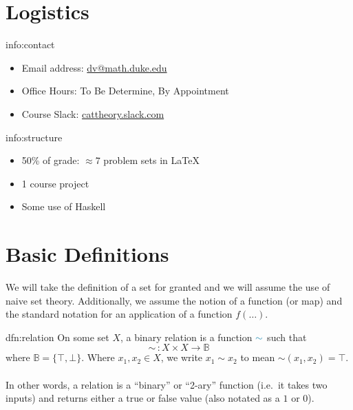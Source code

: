 



\section{Logistics}\label{sec:logistics}

\begin{info}{info:contact}
    \begin{itemize}
        \item Email address: \href{mailto:dv@math.duke.edu}{dv@math.duke.edu}
        \item Office Hours: To Be Determine, By Appointment
        \item Course Slack: \href{cattheory.slack.com}{cattheory.slack.com}
    \end{itemize}
\end{info}

\begin{info}{info:structure}
    \begin{itemize}
        \item 50\% of grade: \( \approx 7 \) problem sets in \LaTeX
        \item 1 course project
        \item Some use of Haskell
    \end{itemize}
\end{info}

\section{Basic Definitions}\label{sec:definitions}

We will take the definition of a set for granted and we will assume the use of naive set theory.
Additionally, we assume the notion of a function (or map) and the standard notation for an application of a function \( f(\ldots) \).

\begin{dfn}[Relation]{dfn:relation}
    On some set \( X \), a \textcolor{dfn-color}{binary relation} is a function \( \textcolor{dfn-color}{\sim} \) such that
    \[
        \sim \, : X \times X \to \mathbb{B}
    \]
    where \( \mathbb{B} = \{ \top, \bot \} \).
    Where \( x_1, x_2 \in X \), we write \( x_1 \sim x_2 \) to mean \( \sim(x_1, x_2) = \top \).
    \\ \\
    In other words, a relation is a ``binary'' or ``2-ary'' function (i.e.\ it takes two inputs) and returns either a true or false value (also notated as a \( 1 \) or \( 0 \)).
\end{dfn}

